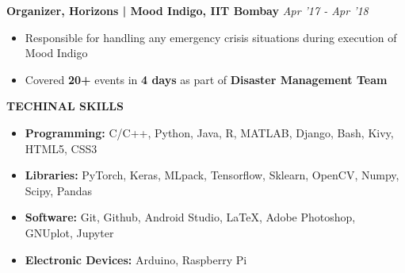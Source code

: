 \documentclass[11pt]{article}%
\begin{document}
\vspace{-5mm}
{\flushleft \bf \large{Organizer, Horizons | Mood Indigo, IIT Bombay}} \hfill {{{\em {Apr '17 - Apr '18}}}}
\begin{itemize}
\setlength\itemsep{0.01em}
\vspace{-3mm}
\item Responsible for handling any emergency crisis situations during execution of Mood Indigo
\vspace{-1.2mm}
\item Covered {\bf 20+} events in {\bf 4 days} as part of {\bf Disaster Management Team}
\end{itemize}



\begin{flushleft}
\bf{\LARGE{T}\Large{ECHINAL} \LARGE{S}\Large{KILLS}}
\end{flushleft}
\vspace{-7mm}
\hrulefill
\vspace{-3mm}
\begin{itemize}
    \setlength\itemsep{0.01em}
    \item \textbf{Programming:} C/C++, Python, Java, R, MATLAB, Django, Bash, Kivy, HTML5, CSS3
    \vspace{-1.2mm}
    \item \textbf{Libraries:} PyTorch, Keras, MLpack, Tensorflow, Sklearn, OpenCV, Numpy, Scipy, Pandas
    \vspace{-1.2mm}
    \item \textbf{Software:}  Git, Github, Android Studio, \LaTeX, Adobe Photoshop, GNUplot, Jupyter
    \vspace{-1.2mm}
    \item \textbf{Electronic Devices:} Arduino, Raspberry Pi
\end{itemize}

\vspace{-4mm}
\end{document}
